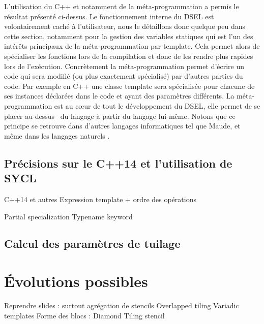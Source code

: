 L'utilisation du \textsf{C++} et notamment de la méta-programmation a permis le résultat présenté ci-dessus. Le fonctionnement interne du DSEL est volontairement caché à l'utilisateur, nous le détaillons donc quelque peu dans cette section, notamment pour la gestion des variables statiques qui est l'un des intérêts principaux de la méta-programmation par template. Cela permet alors de spécialiser les fonctions lors de la compilation et donc de les rendre plus rapides lors de l'exécution. Concrètement la méta-programmation permet d'écrire un code qui sera modifié (ou plus exactement spécialisé) par d'autres parties du code. Par exemple en \textsf{C++} une classe template sera spécialisée pour chacune de ses instances déclarées dans le code et ayant des paramètres différents. La méta-programmation est au cœur de tout le développement du DSEL, elle permet de se placer \og au-dessus \fg~du langage à partir du langage lui-même. Notons que ce principe se retrouve dans d'autres langages informatiques tel que \textsf{Maude}, et même dans les langages naturels \cite{Web6}.

\subsection{Précisions sur le \textsf{C++14} et l'utilisation de \textsf{SYCL}}

C++14 et autres
Expression template \cite{Web4,Art21}
+ ordre des opérations

Partial specialization \cite{Web1}
Typename keyword \cite{Web2}


\subsection{Calcul des paramètres de tuilage}
\label{sec:param_tuile}



\section{\'Evolutions possibles}
\label{sec:evol_biblio}

Reprendre slides : surtout agrégation de stencils
Overlapped tiling \cite{Art17}
Variadic templates \cite{Art6}
Forme des blocs : Diamond Tiling stencil \cite{Art16}


